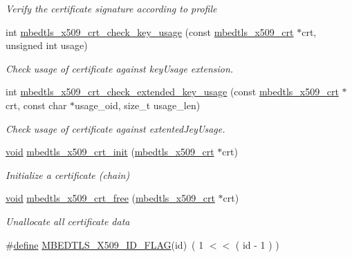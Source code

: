 \begin{DoxyCompactItemize}
\begin{DoxyCompactList}\small\item\em Verify the certificate signature according to profile \end{DoxyCompactList}\item 
int \hyperlink{group__x509__module_ga0ab7857ffd82467207e718bb9f0131a2}{mbedtls\+\_\+x509\+\_\+crt\+\_\+check\+\_\+key\+\_\+usage} (const \hyperlink{structmbedtls__x509__crt}{mbedtls\+\_\+x509\+\_\+crt} $\ast$crt, unsigned int usage)
\begin{DoxyCompactList}\small\item\em Check usage of certificate against key\+Usage extension. \end{DoxyCompactList}\item 
int \hyperlink{group__x509__module_gad21c0e75a3fdbeb1f65e4d339e479df3}{mbedtls\+\_\+x509\+\_\+crt\+\_\+check\+\_\+extended\+\_\+key\+\_\+usage} (const \hyperlink{structmbedtls__x509__crt}{mbedtls\+\_\+x509\+\_\+crt} $\ast$crt, const char $\ast$usage\+\_\+oid, size\+\_\+t usage\+\_\+len)
\begin{DoxyCompactList}\small\item\em Check usage of certificate against extented\+Jey\+Usage. \end{DoxyCompactList}\item 
\hyperlink{interfacevoid}{void} \hyperlink{group__x509__module_ga016dd06bc770e77b84005f305df20ed1}{mbedtls\+\_\+x509\+\_\+crt\+\_\+init} (\hyperlink{structmbedtls__x509__crt}{mbedtls\+\_\+x509\+\_\+crt} $\ast$crt)
\begin{DoxyCompactList}\small\item\em Initialize a certificate (chain) \end{DoxyCompactList}\item 
\hyperlink{interfacevoid}{void} \hyperlink{group__x509__module_gab33c1e4e20bea7ce536119f54a113c6b}{mbedtls\+\_\+x509\+\_\+crt\+\_\+free} (\hyperlink{structmbedtls__x509__crt}{mbedtls\+\_\+x509\+\_\+crt} $\ast$crt)
\begin{DoxyCompactList}\small\item\em Unallocate all certificate data \end{DoxyCompactList}\item 
\#\hyperlink{structdefine}{define} \hyperlink{group__x509__module_gaedcb73f1c615c266a348a0c62763c5de}{M\+B\+E\+D\+T\+L\+S\+\_\+\+X509\+\_\+\+I\+D\+\_\+\+F\+L\+AG}(id)~( 1 $<$$<$ ( id -\/ 1 ) )
\item 
\mbox{\label{group__x509__module_ga8d124765addc200627de55f2018b1ed3}} 
$$
\end{DoxyCompactItemize}
